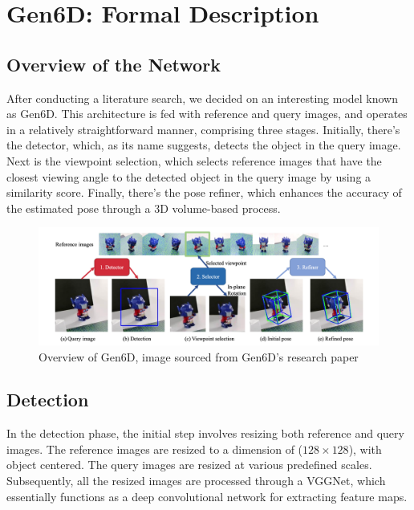 
\chapter{Gen6D: Formal Description}\label{chapter:gen6d_formal_description}

\section{Overview of the Network}
After conducting a literature search, we decided on an interesting model known as Gen6D. This architecture is fed with reference and query images, and operates in a relatively straightforward manner, comprising three stages. Initially, there's the detector, which, as its name suggests, detects the object in the query image. Next is the viewpoint selection, which selects reference images that have the closest viewing angle to the detected object in the query image by using a similarity score. Finally, there's the pose refiner, which enhances the accuracy of the estimated pose through a 3D volume-based process.

\begin{figure}[ht]
  \centering
  \includegraphics[width=\textwidth]{data/gen6d1.png}
  \caption{Overview of Gen6D, image sourced from Gen6D's research paper}
  \label{fig:fig13}
\end{figure}

\section{Detection}

In the detection phase, the initial step involves resizing both reference and query images. The reference images are resized to a dimension of ($128 \times 128$), with object centered. The query images are resized at various predefined scales. Subsequently, all the resized images are processed through a \ac{VGGNet}, which essentially functions as a deep convolutional network for extracting feature maps.

